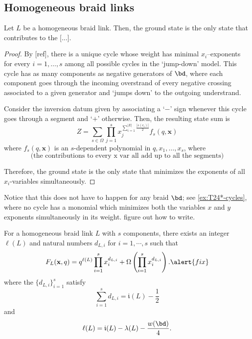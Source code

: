 \documentclass[11pt,e-only]{amsart}
\begin{document}
\subsection{Homogeneous braid links}

\begin{proposition}\label{prop:ground-state} Let $L$ be a homogeneous braid link. Then, the ground state is the only state that contributes to the [...].
\end{proposition}

\begin{proof} By \alert{[ref]}, there is a unique cycle whose weight has minimal $x_i$--exponents for every $i=1,\dots,s$ among all possible cycles in the `jump-down' model. This cycle has as many components as negative generators of $\bd$, where each component goes through the incoming overstrand of every negative crossing associated to a given generator and `jumps down' to the outgoing understrand. 

Consider the inversion datum given by associating a `$-$' sign whenever this cycle goes through a segment and `$+$' otherwise. %
Then, the resulting state sum is
\begin{equation}
    Z = \sum_{s\in\Omega} \prod_{j=1}^s x_j^{\sum_{i=1}^{|E|} \frac{|s(e_i)|}{2}} f_s(q,\mathbf{x})
\end{equation}
where $f_s(q,\mathbf{x})$ is an $s$-dependent polynomial in $q,x_1,\dots,x_s$, where
\begin{equation}
    \text{(the contributions to every x var all add up to all the segments)}
\end{equation}

Therefore, the ground state is the only state that minimizes the exponents of all $x_i$-variables simultaneously. 
\end{proof}

Notice that this does not have to happen for any braid $\bd$; see \cref{ex:T24*-cycles}, where no cycle has a monomial which minimizes both the variables $x$ and $y$ exponents simultaneously in its weight.
\alert{figure out how to write}.

\begin{theorem}\label{thm:L} For a homogeneous braid link $L$ with $s$ components, there exists an integer $\ell(L)$ and natural numbers $d_{L,i}$ for $i=1,\cdots,s$ such that
\begin{equation}
    F_{L}(\mathbf{x},q)= q^{\ell(L)}\prod_{i=1}^s x_i^{d_{L,i}}
    +\Omega\left(\prod_{i=1}^s x_i^{d_{L,i}}\right). \alert{fix}
\end{equation}
where the $\{d_{L,i}\}_{i=1}^s$ satisfy
\begin{equation}
    \sum_{i=1}^s d_{L,i} = \mathfrak{i}(L)-\frac12
\end{equation}
and
\begin{equation}
    \ell(L)=\mathfrak{i}(L)-\lambda(L)-\frac{w(\bd)}{4}.
\end{equation}
\end{theorem}
\end{document}
